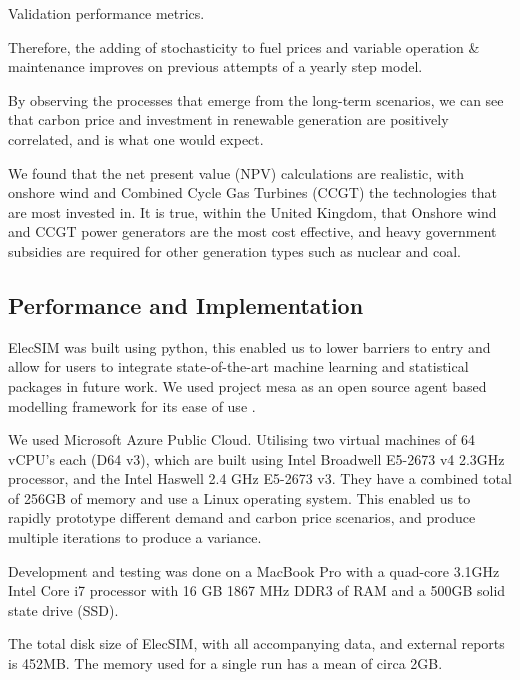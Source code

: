 \begin{table}[h]
	\centering
	\caption{Validation performance metrics.}
	\label{table:validation_metrics}
\end{table}

Therefore, the adding of stochasticity to fuel prices and variable operation \& maintenance improves on previous attempts of a yearly step model.

By observing the processes that emerge from the long-term scenarios, we can see that carbon price and investment in renewable generation are positively correlated, and is what one would expect.

We found that the net present value (NPV) calculations are realistic, with onshore wind and Combined Cycle Gas Turbines (CCGT) the technologies that are most invested in. It is true, within the United Kingdom, that Onshore wind and CCGT power generators are the most cost effective, and heavy government subsidies are required for other generation types such as nuclear and coal. 



\subsection{Performance and Implementation}

ElecSIM was built using python, this enabled us to lower barriers to entry and allow for users to integrate state-of-the-art machine learning and statistical packages in future work. We used project mesa as an open source agent based modelling framework for its ease of use \cite{Masad2015}.

 We used Microsoft Azure Public Cloud. Utilising two virtual machines of 64 vCPU's each (D64 v3), which are built using Intel Broadwell E5-2673 v4 2.3GHz processor, and the Intel Haswell 2.4 GHz E5-2673 v3. They have a combined total of 256GB of memory and use a Linux operating system. This enabled us to rapidly prototype different demand and carbon price scenarios, and produce multiple iterations to produce a variance.

Development and testing was done on a MacBook Pro with a quad-core 3.1GHz Intel Core i7 processor with 16 GB 1867 MHz DDR3 of RAM and a 500GB solid state drive (SSD).

The total disk size of ElecSIM, with all accompanying data, and external reports is 452MB. The memory used for a single run has a mean of circa 2GB.

